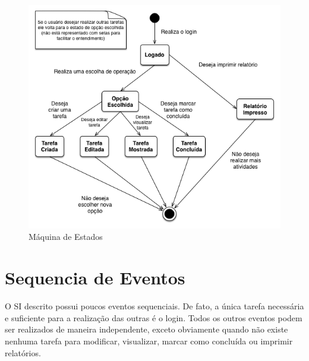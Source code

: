 \documentclass[a4paper, 12pt]{article}
\begin{document}
	\begin{figure}[H]
		\centering
		\includegraphics[scale=0.6]{statemachine.png}
		\caption{Máquina de Estados}
	\end{figure}
	
	\newpage
	
	\section{Sequencia de Eventos}
	
	O SI descrito possui poucos eventos sequenciais. De fato, a única tarefa necessária e suficiente para a realização das outras é o login. Todos os outros eventos podem ser realizados de maneira independente, exceto obviamente quando não existe nenhuma tarefa para modificar, visualizar, marcar como concluída ou imprimir relatórios. \\\\
	
\end{document}
